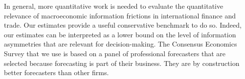 In general, more quantitative work is needed to evaluate the quantitative relevance of macroeconomic information frictions in international finance and trade. Our estimates provide a useful conservative benchmark to do so. Indeed, our estimates can be interpreted as a lower bound on the level of information asymmetries that are relevant for decision-making. The Consensus Economics Survey that we use is based on a panel of professional forecasters that are selected because forecasting is part of their business. They are by construction better forecasters than other firms. %
